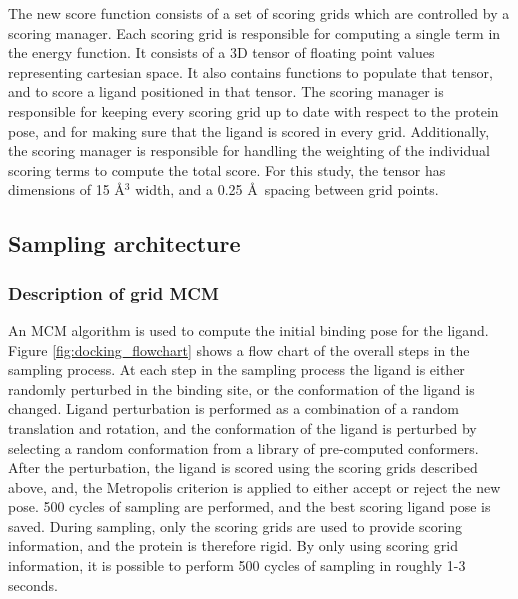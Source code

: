 The new score function consists of a set of scoring grids which are controlled by a scoring manager.
Each scoring grid is responsible for computing a single term in the energy function.
It consists of a 3D tensor of floating point values representing cartesian space.
It also contains functions to populate that tensor, and to score a ligand positioned in that tensor.
The scoring manager is responsible for keeping every scoring grid up to date with respect to the protein pose, and for making sure that the ligand is scored in every grid.
Additionally, the scoring manager is responsible for handling the weighting of the individual scoring terms to compute the total score.
For this study, the tensor has dimensions of 15 \AA$^{3}$ width, and a 0.25 \AA\ spacing between grid points. 

\subsection{Sampling architecture}
\subsubsection{Description of grid \acs{MCM}}
An \ac{MCM} algorithm is used to compute the initial binding pose for the ligand.
Figure \ref{fig:docking_flowchart} shows a flow chart of the overall steps in the sampling process.
At each step in the sampling process the ligand is either randomly perturbed in the binding site, or the conformation of the ligand is changed.
Ligand perturbation is performed as a combination of a random translation and rotation, and the conformation of the ligand is perturbed by selecting a random conformation from a library of pre-computed conformers.
After the perturbation, the ligand is scored using the scoring grids described above, and, the Metropolis criterion is applied to either accept or reject the new pose.
500 cycles of sampling are performed, and the best scoring ligand pose is saved.
During sampling, only the scoring grids are used to provide scoring information, and the protein is therefore rigid.
By only using scoring grid information, it is possible to perform 500 cycles of sampling in roughly 1-3 seconds.

